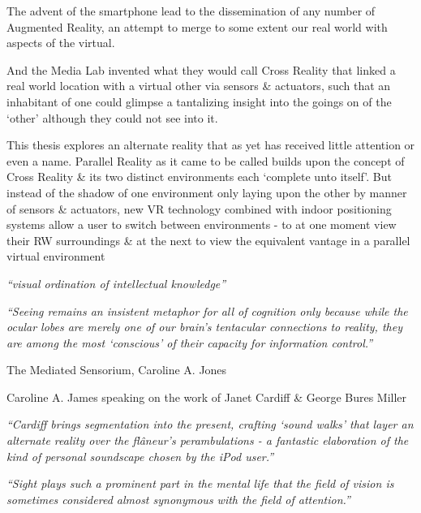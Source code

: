 The advent of the smartphone lead to the dissemination of any number of Augmented Reality, an attempt to merge to some extent our real world with aspects of the virtual.


And the Media Lab invented what they would call Cross Reality that linked a real world location with a virtual other via sensors \& actuators, such that an inhabitant of one could glimpse a tantalizing insight into the goings on of the `other' although they could not see into it.

This thesis explores an alternate reality that as yet has received little attention or even a name. Parallel Reality as it came to be called builds upon the concept of Cross Reality \& its two distinct environments each `complete unto itself'. But instead of the shadow of one environment only laying upon the other by manner of sensors \& actuators, new VR technology combined with indoor positioning systems allow a user to switch between environments - to at one moment view their RW surroundings \& at the next to view the equivalent vantage in a parallel virtual environment


\textit{``visual ordination of intellectual knowledge''}

\textit{``Seeing remains an insistent metaphor for all of cognition only because while the ocular lobes are merely one of our brain's tentacular connections to reality, they are among the most `conscious' of their capacity for information control.''}

The Mediated Sensorium, Caroline A. Jones



Caroline A. James speaking on the work of Janet Cardiff \& George Bures Miller

\textit{``Cardiff brings segmentation into the present, crafting `sound walks' that layer an alternate reality over the fl\^aneur's perambulations - a fantastic elaboration of the kind of personal soundscape chosen by the iPod user.''}


\textit{``Sight plays such a prominent part in the mental life that the field of vision is sometimes considered almost synonymous with the field of attention.''}~\cite{Lucas1951}